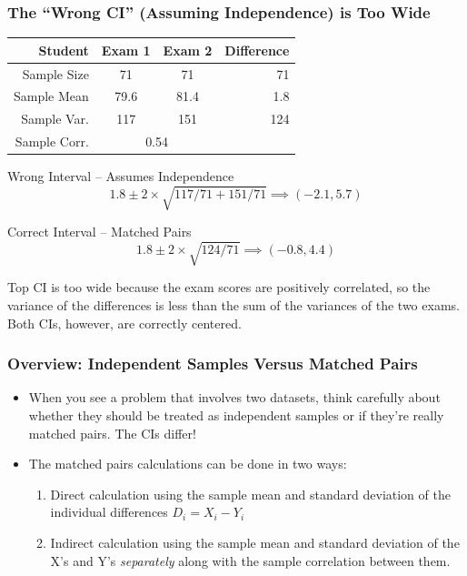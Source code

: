 \documentclass[handout]{beamer}
\begin{document}
\begin{frame}
\frametitle{The ``Wrong CI'' (Assuming Independence) is Too Wide}
\footnotesize
%
\begin{table}[!tbp]
\begin{center}
\begin{tabular}{rccr}
\hline\hline
\multicolumn{1}{r}{Student}&\multicolumn{1}{c}{Exam 1}&\multicolumn{1}{c}{Exam 2}&\multicolumn{1}{r}{Difference}\tabularnewline
\hline
Sample Size & 71 & 71 & 71\\
Sample Mean & 79.6 & 81.4  &1.8\\
Sample Var. &117  & 151 & 124\\
Sample Corr.& \multicolumn{2}{c}{0.54}&\\
\hline
\end{tabular}
\end{center}
\end{table}

\singlespacing
\small

\begin{block}{Wrong Interval -- Assumes Independence}
$$1.8 \pm 2\times  \sqrt{117/71 + 151/71} \implies (-2.1, 5.7)$$
\end{block}

\pause

\begin{block}{Correct Interval -- Matched Pairs}
$$1.8 \pm 2\times  \sqrt{124/71} \implies (-0.8, 4.4)$$
\end{block}

\pause
\alert{Top CI is too wide because the exam scores are positively correlated, so the variance of the differences is less than the sum of the variances of the two exams. Both CIs, however, are correctly centered.}

\end{frame}


\begin{frame}
\frametitle{Overview: Independent Samples Versus Matched Pairs}

\begin{itemize}
	\item When you see a problem that involves two datasets, think carefully about whether they should be treated as independent samples or if they're really matched pairs. The CIs differ! 
	\item The matched pairs calculations can be done in two ways: 
		\begin{enumerate}
			\item Direct calculation using the sample mean and standard deviation of the individual differences $D_i = X_i - Y_i$ 
			\item Indirect calculation using the sample mean and standard deviation of the X's and Y's \emph{separately} along with the sample correlation between them. 
		\end{enumerate}
\end{itemize}
\end{frame}
\end{document}
